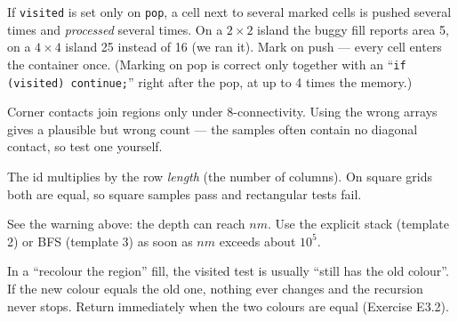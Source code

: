 \begin{warningbox}
If \texttt{visited} is set only on \texttt{pop}, a cell next to several marked cells is pushed several times and \emph{processed} several times. On a $2\times2$ island the buggy fill reports area 5, on a $4\times4$ island 25 instead of 16 (we ran it). Mark on push --- every cell enters the container once. (Marking on pop is correct only together with an ``\texttt{if (visited) continue;}'' right after the pop, at up to 4 times the memory.)
\end{warningbox}

\begin{warningbox}
\begin{center}
\end{center}
Corner contacts join regions only under 8-connectivity. Using the wrong arrays gives a plausible but wrong count --- the samples often contain no diagonal contact, so test one yourself.
\end{warningbox}

\begin{warningbox}
The id multiplies by the row \emph{length} (the number of columns). On square grids both are equal, so square samples pass and rectangular tests fail.
\end{warningbox}

\begin{warningbox}
See the warning above: the depth can reach $nm$. Use the explicit stack (template 2) or BFS (template 3) as soon as $nm$ exceeds about $10^5$.
\end{warningbox}

\begin{warningbox}
In a ``recolour the region'' fill, the visited test is usually ``still has the old colour''. If the new colour equals the old one, nothing ever changes and the recursion never stops. Return immediately when the two colours are equal (Exercise E3.2).
\end{warningbox}

